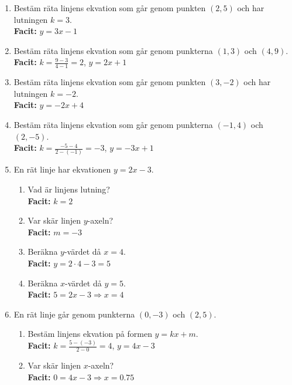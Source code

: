 \documentclass[a4paper,11pt]{article}
\begin{document}
\begin{enumerate}[label=\textbf{\arabic*.}]
    \item Bestäm räta linjens ekvation som går genom punkten $(2, 5)$ och har lutningen $k = 3$.
    \\ \textbf{Facit:} $y = 3x - 1$
    
    \item Bestäm räta linjens ekvation som går genom punkterna $(1, 3)$ och $(4, 9)$.
    \\ \textbf{Facit:} $k = \frac{9-3}{4-1}=2$, $y = 2x + 1$
    
    \item Bestäm räta linjens ekvation som går genom punkten $(3, -2)$ och har lutningen $k = -2$.
    \\ \textbf{Facit:} $y = -2x + 4$
    
    \item Bestäm räta linjens ekvation som går genom punkterna $(-1, 4)$ och $(2, -5)$.
    \\ \textbf{Facit:} $k = \frac{-5-4}{2-(-1)} = -3$, $y = -3x + 1$
    
    \item En rät linje har ekvationen $y = 2x - 3$.
    \begin{enumerate}[label=\alph*)]
        \item Vad är linjens lutning?
        \\ \textbf{Facit:} $k=2$
        \item Var skär linjen $y$-axeln?
        \\ \textbf{Facit:} $m=-3$
        \item Beräkna $y$-värdet då $x = 4$.
        \\ \textbf{Facit:} $y = 2\cdot4 - 3 = 5$
        \item Beräkna $x$-värdet då $y = 5$.
        \\ \textbf{Facit:} $5 = 2x - 3 \Rightarrow x = 4$
    \end{enumerate}
    
    \item En rät linje går genom punkterna $(0, -3)$ och $(2, 5)$.
    \begin{enumerate}[label=\alph*)]
        \item Bestäm linjens ekvation på formen $y = kx + m$.
        \\ \textbf{Facit:} $k = \frac{5-(-3)}{2-0}=4$, $y=4x-3$
        \item Var skär linjen $x$-axeln?
        \\ \textbf{Facit:} $0 = 4x-3 \Rightarrow x = 0.75$
    \end{enumerate}
\end{enumerate}
\end{document}
